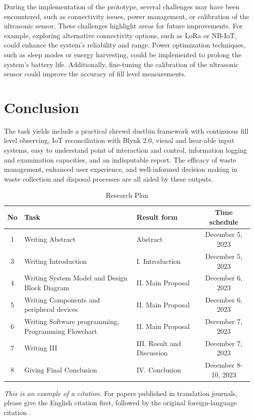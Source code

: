 \documentclass[conference, onecolumn]{IEEEtran}
\begin{document}
During the implementation of the prototype, several challenges may have been encountered, such as connectivity issues, power management, or calibration of the ultrasonic sensor. These challenges highlight areas for future improvements. For example, exploring alternative connectivity options, such as LoRa or NB-IoT, could enhance the system's reliability and range. Power optimization techniques, such as sleep modes or energy harvesting, could be implemented to prolong the system's battery life. Additionally, fine-tuning the calibration of the ultrasonic sensor could improve the accuracy of fill level measurements.\\


\section{Conclusion}
The task yields include a practical shrewd dustbin framework with continuous fill level observing, IoT reconciliation with Blynk 2.0, visual and hear-able input systems, easy to understand point of interaction and control, information logging and examination capacities, and an indisputable report. The efficacy of waste management, enhanced user experience, and well-informed decision making in waste collection and disposal processes are all aided by these outputs.\\

\begin{table}[htbp]
\caption{Research Plan}
\begin{center}
\begin{tabular}{|c|l|l|c|}
\hline
\textbf{No}&\textbf{Task} & \textbf{Result form}& \textbf{Time schedule} \\
\hline
1 & Writing Abstract & Abstract & December 5, 2023 \\
\hline
3 & Writing Introduction & I. Introduction & December 5, 2023 \\
\hline
4 & Writing System Model and Design Block Diagram & II. Main Proposal & December 6, 2023 \\
\hline
5 & Writing Components and peripheral devices & II. Main Proposal & December 6, 2023 \\
\hline
6 & Writing Software programming, Programming Flowchart & II. Main Proposal & December 7, 2023 \\
\hline
7 & Writing III& III. Result and Discussion & December 7, 2023 \\
\hline
8 & Giving Final Conclusion& IV. Conclusion & December 8-10, 2023 \\
\hline
\end{tabular}
\label{tab1}
\end{center}
\end{table}
\emph{This is an example of a citation.}
For papers published in translation journals, please give the English citation first, followed by the original foreign-language citation \cite{dang2014her,anh2020waste,Khorov_2018,dang2015hybrid}  \cite{pham_jit}.


\end{document}
